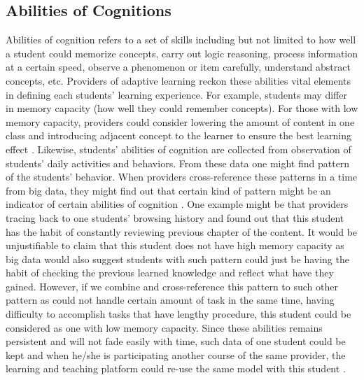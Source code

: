 \documentclass[sigconf]{acmart}
\begin{document}
\subsection{Abilities of Cognitions}
Abilities of cognition refers to a set of skills including but not limited to how well a student could memorize concepts, carry out logic reasoning, process information at a certain speed, observe a phenomenon or item carefully, understand abstract concepts, etc. Providers of adaptive learning reckon these abilities vital elements in defining each students’ learning experience. 
For example, students may differ in memory capacity (how well they could remember concepts). For those with low memory capacity, providers could consider lowering the amount of content in one class and introducing adjacent concept to the learner to ensure the best learning effect \cite{Pashler2008}.
Likewise, students’ abilities of cognition are collected from observation of students’ daily activities and behaviors. From these data one might find pattern of the students’ behavior. When providers cross-reference these patterns in a time from big data, they might find out that certain kind of pattern might be an indicator of certain abilities of cognition \cite{Kinshuk2006}. 
One example might be that providers tracing back to one students’ browsing history and found out that this student has the habit of constantly reviewing previous chapter of the content. It would be unjustifiable to claim that this student does not have high memory capacity as big data would also suggest students with such pattern could just be having the habit of checking the previous learned knowledge and reflect what have they gained. However, if we combine and cross-reference this pattern to such other pattern as could not handle certain amount of task in the same time, having difficulty to accomplish tasks that have lengthy procedure, this student could be considered as one with low memory capacity.
Since these abilities remains persistent and will not fade easily with time, such data of one student could be kept and when he/she is participating another course of the same provider, the learning and teaching platform could re-use the same model with this student \cite{Lalley2009}.
\end{document}
